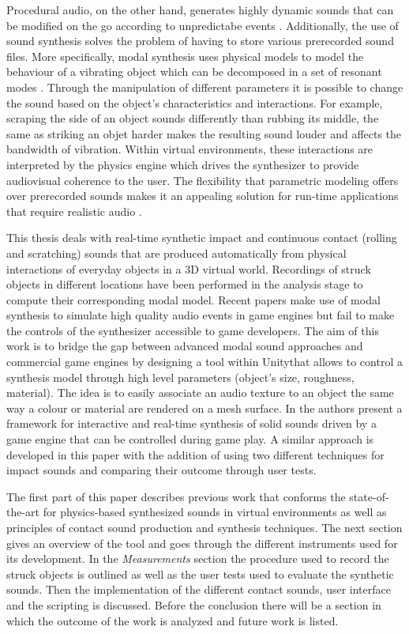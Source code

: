 Procedural audio, on the other hand, generates highly dynamic sounds that can be modified on the go according to unpredictabe events \cite{farnell2010designing}. Additionally, the use of sound synthesis solves the problem of having to store various prerecorded sound files. More specifically, modal synthesis uses physical models to model the behaviour of a vibrating object which can be decomposed in a set of resonant modes \cite{bilbao2009numerical}. Through the manipulation of different parameters it is possible to change the sound based on the object's characteristics and interactions. For example, scraping the side of an object sounds differently than rubbing its middle, the same as striking an objet harder makes the resulting sound louder and affects the bandwidth of vibration. Within virtual environments, these interactions are interpreted by the physics engine which drives the synthesizer to provide audiovisual coherence to the user.  The flexibility that parametric modeling offers over prerecorded sounds makes it an appealing solution for run-time applications that require realistic audio \cite{Cook:2002:RSS:515316}. 

This thesis deals with real-time synthetic impact and continuous contact (rolling and scratching) sounds that are produced automatically from physical interactions of everyday objects in a 3D virtual world. Recordings of struck objects in different locations have been performed in the analysis stage to compute their corresponding modal model. Recent papers \cite{lloyd2011sound, bonneel2008fast} make use of modal synthesis to simulate high quality audio events in game engines but fail to make the controls of the synthesizer accessible to game developers. The aim of this work is to bridge the gap between advanced modal sound approaches and commercial game engines by designing a tool within Unity\textregistered that allows to control a synthesis model through high level parameters (object's size, roughness, material). The idea is to easily associate an audio texture to an object the same way  a colour or material are rendered on a mesh surface. In \cite{pruvost2015perception} the authors present a framework for interactive and real-time synthesis of solid sounds driven by a game engine that can be controlled during game play. A similar approach is developed in this paper with the addition of using two different techniques for impact sounds and comparing their outcome through user tests. 

The first part of this paper describes previous work that conforms the state-of-the-art for physics-based synthesized sounds in virtual environments as well as principles of contact sound production and synthesis techniques. The next section gives an overview of the tool and goes through the different instruments used for its development. In the \textit{Measurements} section the procedure used to record the struck objects is outlined as well as the user tests used to evaluate the synthetic sounds. Then the implementation of the different contact sounds, user interface and the scripting is discussed. Before the conclusion there will be a section in which the outcome of the work is analyzed and future work is listed. 

